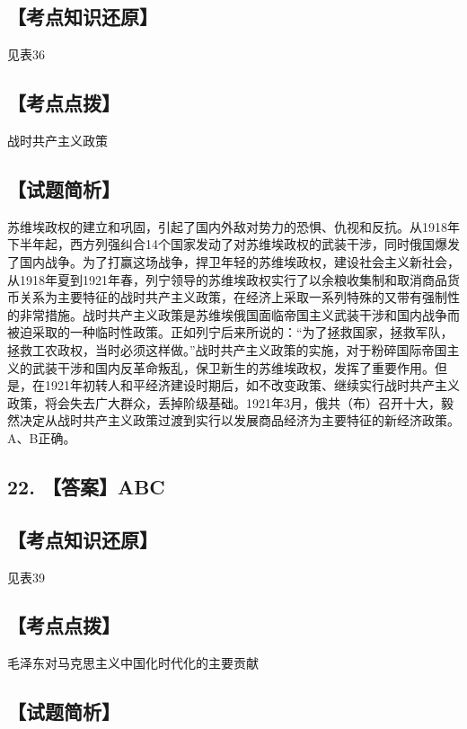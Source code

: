 \documentclass[UTF8,11pt]{ctexart}
\begin{document}
\subsection*{【考点知识还原】}

见表36


\subsection*{【考点点拨】}

战时共产主义政策


\subsection*{【试题简析】}

苏维埃政权的建立和巩固，引起了国内外敌对势力的恐惧、仇视和反抗。从1918年下半年起，西方列强纠合14个国家发动了对苏维埃政权的武装干涉，同时俄国爆发了国内战争。为了打赢这场战争，捍卫年轻的苏维埃政权，建设社会主义新社会，从1918年夏到1921年春，列宁领导的苏维埃政权实行了以余粮收集制和取消商品货币关系为主要特征的战时共产主义政策，在经济上采取一系列特殊的又带有强制性的非常措施。战时共产主义政策是苏维埃俄国面临帝国主义武装干涉和国内战争而被迫采取的一种临时性政策。正如列宁后来所说的：“为了拯救国家，拯救军队，拯救工农政权，当时必须这样做。”战时共产主义政策的实施，对于粉碎国际帝国主义的武装干涉和国内反革命叛乱，保卫新生的苏维埃政权，发挥了重要作用。但是，在1921年初转人和平经济建设时期后，如不改变政策、继续实行战时共产主义政策，将会失去广大群众，丢掉阶级基础。1921年3月，俄共（布）召开十大，毅然决定从战时共产主义政策过渡到实行以发展商品经济为主要特征的新经济政策。A、B正确。


\subsection*{22. 【答案】ABC}

\subsection*{【考点知识还原】}

见表39


\subsection*{【考点点拨】}

毛泽东对马克思主义中国化时代化的主要贡献


\subsection*{【试题简析】}
\end{document}

